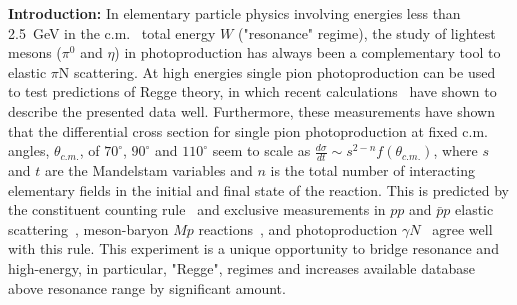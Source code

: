 \documentclass[aps,prc,onecolumn,floatfix,showpacs,preprintnumbers,amsmath,amssymb,superscriptaddress]{revtex4-1}
\begin{document}
\textbf{Introduction:} In elementary particle physics involving 
energies less than 2.5~GeV in the c.m.~ total energy $W$ 
("resonance" regime), the study of lightest mesons ($\pi^0$ and 
$\eta$) in photoproduction has always been a complementary tool to 
elastic $\pi$N scattering. 
At high energies single pion photoproduction can be used to test predictions of Regge theory, in which recent calculations~\cite{JPAC} have shown to describe the presented data well. Furthermore, these measurements have shown that the differential cross section for single pion photoproduction at fixed c.m. angles, $\theta_{c.m.}$, of $70^{\circ}$, $90^{\circ}$ and $110^{\circ}$ seem to scale as $\frac{d\sigma}{dt} \sim s^{2-n}f(\theta_{c.m.})$, where $s$ and $t$ are the Mandelstam variables and $n$ is the total number of interacting elementary fields in the initial and final state of the reaction. This is predicted by the constituent counting rule~\cite{scaling1,scaling2} and exclusive measurements in $pp$ and  $\bar{p}p$ elastic scattering~\cite{scalingexp5, scalingexp7}, meson-baryon $M p$ reactions~\cite{scalingexp7}, and photoproduction $\gamma N$~\cite{scalingexp2, scalingexp3, scalingexp4, scalingexp6, scalingexp8, scalingexp9, scalingexp10, scalingexp11} agree well with this rule. 
This experiment is a unique opportunity to bridge resonance and 
high-energy, in particular, "Regge", regimes and increases 
available database above resonance range by significant amount.
\end{document}
